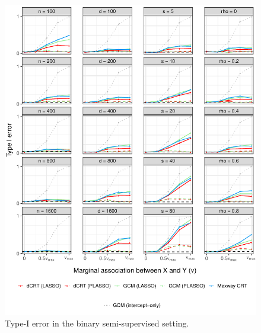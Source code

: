 \documentclass[aos]{imsart}
\theoremstyle{definition}
\theoremstyle{remark}
\begin{document}
\begin{figure}[!ht]
	\centering
	\includegraphics[width = \textwidth]{figures/binomial_semi_supervised_setting_null.pdf}
	\caption{Type-I error in the binary semi-supervised setting.}
	\label{fig:binomial_semi-supervised_null}
\end{figure}
\end{document}
